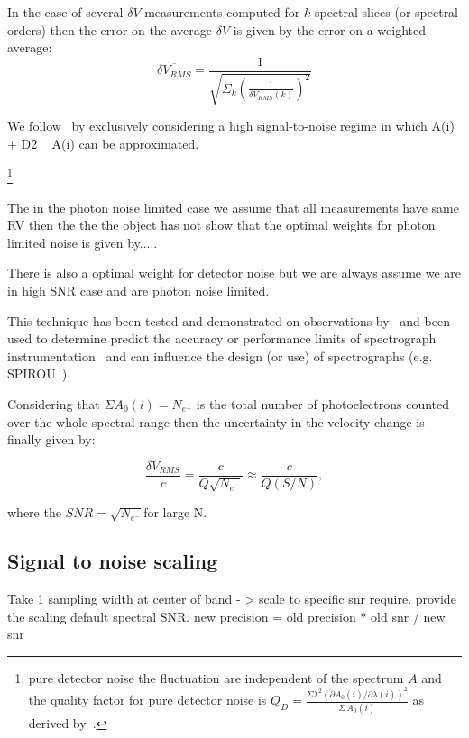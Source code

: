In the case of several \(\delta  V\) measurements computed for \(k\) spectral slices (or spectral orders) then the error on the average \(\delta V\) is given by the error on a weighted average:
\begin{equation}
\overline{\delta {V}_{RMS}} = \frac{1}{\sqrt{\Sigma_k{(\frac{1}{\delta V_{RMS}(k)})^2}}}
\end{equation}


We follow~\cite{figueira_radial_2016} by exclusively considering  a high signal-to-noise regime in which A(i) + D\^2 ~ A(i) can be approximated.


\footnote{ pure detector noise the fluctuation are independent of the spectrum \(A\) and the quality factor for pure detector noise is \(Q_D = \frac{\Sigma{\lambda^2 {(\partial A_0(i)/\partial \lambda(i))}^{2}}}{\Sigma{\, A_0(i)}}\) as derived by~\cite{Connes1985}. }

The in the photon noise limited case we assume that all measurements have same RV then the the the object has not
\citet{Connes1985} show that the optimal weights for photon limited noise is given by.....

There is also a optimal weight for detector noise but we are always assume we are in high SNR case and are photon noise limited.


This technique has been tested and demonstrated on observations by~\citet{connes_demonstration_1996} and been used to determine predict the accuracy or performance limits of spectrograph instrumentation~\citet{Connes1985,bouchy_fundamental_2001} and can influence the design (or use) of spectrographs
 (e.g. SPIROU~\citep{artigau_spirou_2014,figueira_radial_2016})


Considering that \(\Sigma{A_0(i)} = N_{e^-} \) is the total number of photoelectrons counted over the whole spectral range then the uncertainty in the velocity change is finally given by:

\begin{equation}
\frac{\delta V_{RMS}}{c} = \frac{c}{Q \sqrt{N_{e^-}}} \approx \frac{c}{Q (S/N)},
\end{equation}

where the \(SNR=\sqrt{N_{e^-}} \)for large N. 




\subsection {Signal to noise scaling}
Take 1 sampling width at center of band - > scale to specific snr require.
provide the scaling default spectral SNR.
new precision = old precision * old snr / new snr

